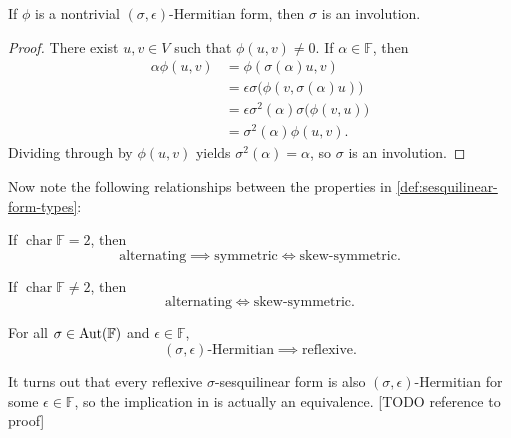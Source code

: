 \documentclass[a4paper, 11pt]{memoir}
\DeclareMathOperator{\chr}{char}
\theoremstyle{plaincustomnumber}
\theoremstyle{changedotbreakcustomnumber}
\newcommand{\field}{\mathbb{F}}
\begin{document}
\begin{lemma}
    \label{lem:Hermitian-implies-involution}
    If $\phi$ is a nontrivial $(\sigma,\epsilon)$-Hermitian form, then $\sigma$ is an involution.
\end{lemma}

\begin{proof}
    There exist $u,v \in V$ such that $\phi(u,v) \neq 0$. If $\alpha \in \field$, then
    \begin{align*}
        \alpha \phi(u,v)
            &= \phi(\sigma(\alpha)u, v) \\
            &= \epsilon \sigma \bigl( \phi(v, \sigma(\alpha)u) \bigr) \\
            &= \epsilon \sigma^2(\alpha) \sigma \bigl( \phi(v,u) \bigr) \\
            &= \sigma^2(\alpha) \phi(u,v).
    \end{align*}
    Dividing through by $\phi(u,v)$ yields $\sigma^2(\alpha) = \alpha$, so $\sigma$ is an involution.
\end{proof}



Now note the following relationships between the properties in \cref{def:sesquilinear-form-types}:

\begin{lemma}
    \begin{enumlem}
        \item If $\chr \field = 2$, then
        \begin{equation*}
            \text{alternating}
                \implies \text{symmetric}
                \iff \text{skew-symmetric}.
        \end{equation*}

        \item If $\chr \field \neq 2$, then
        \begin{equation*}
            \text{alternating}
                \iff \text{skew-symmetric}.
        \end{equation*}

        \item \label{enum:Hermitian-implies-reflexive} For all $\sigma \in \Aut(\field)$ and $\epsilon \in \field$,
        \begin{equation*}
            \text{$(\sigma,\epsilon)$-Hermitian}
                \implies \text{reflexive}.
        \end{equation*}
    \end{enumlem}
\end{lemma}
%
It turns out that every reflexive $\sigma$-sesquilinear form is also $(\sigma,\epsilon)$-Hermitian for some $\epsilon \in \field$, so the implication in  is actually an equivalence. [TODO reference to proof]
\end{document}
